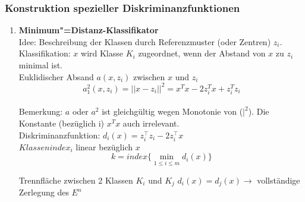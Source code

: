 \documentclass[a4paper,12pt]{scrreprt}
\newcommand{\itemd}[1]{\item{\textbf{#1}} }
\begin{document}
\subsubsection{Konstruktion spezieller Diskriminanzfunktionen}
\begin{enumerate}
	\itemd{Minimum"=Distanz-Klassifikator}\\
	Idee: Beschreibung der Klassen durch
		Referenzmuster (oder Zentren) $z_i$.\\
	Klassifikation: $x$ wird Klasse $K_i$ zugeordnet, wenn der Abstand von
	$x$ zu $z_i$ minimal ist.\\
	Euklidischer Absand $a(x,z_i)$ zwischen $x$ und $z_i$\\
	$$a_1^2 (x,z_i) = || x - z_i ||^2 = x^Tx - 2 z_i^T x + z_i^Tz_i$$\\
	Bemerkung: $a$ oder $a^2$ ist gleichgültig wegen Monotonie von ($|^2$). Die Konstante (bezüglich i) $x^Tx$ auch irrelevant.\\
	Diskriminanzfunktion: $d_i(x)=z_i^\top z_i-2z_i^\top x$\\
	$Klassenindex_i$ linear bezüglich $x$
	 $$k = index \{ \min\limits_{1 \leq i \leq m } d_i(x) \} $$
	
	Trennfläche zwischen 2 Klassen $K_i$ und $K_j$ $d_i(x) = d_j(x) \rightarrow $ vollständige Zerlegung des $E^n$ 
	

\end{enumerate}
\end{document}
